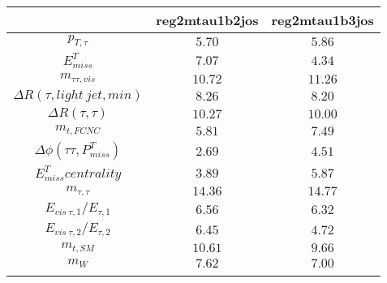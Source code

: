 \centering
\begin{tabular}{ccc} \toprule\toprule
 & reg2mtau1b2jos & reg2mtau1b3jos\\\midrule
$p_{T,\tau }$ & $5.70$ & $5.86$\\
$E^{T}_{miss}$ & $7.07$ & $4.34$\\
$m_{\tau \tau ,vis}$ & $10.72$ & $11.26$\\
$\Delta R(\tau ,light~jet,min)$ & $8.26$ & $8.20$\\
$\Delta R(\tau ,\tau )$ & $10.27$ & $10.00$\\
$m_{t,FCNC}$ & $5.81$ & $7.49$\\
$\Delta\phi(\tau \tau ,P^{T}_{miss})$ & $2.69$ & $4.51$\\
$E^{T}_{miss} centrality$ & $3.89$ & $5.87$\\
$m_{\tau ,\tau }$ & $14.36$ & $14.77$\\
$E_{vis~\tau ,1}/E_{\tau ,1}$ & $6.56$ & $6.32$\\
$E_{vis~\tau ,2}/E_{\tau ,2}$ & $6.45$ & $4.72$\\
$m_{t,SM}$ & $10.61$ & $9.66$\\
$m_{W}$ & $7.62$ & $7.00$\\
\bottomrule\bottomrule\\
\end{tabular}
